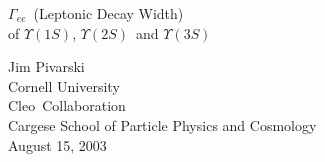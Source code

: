 

\def\ys{$\Upsilon(1S)$}
\def\yss{$\Upsilon(2S)$}
\def\ysss{$\Upsilon(3S)$}
\def\gamee{$\Gamma_{ee}$}
\def\hpqcd{{\sc Hpqcd}}
\def\argus{{\sc Argus}}
\def\cesr{{\sc Cesr}}
\def\cleo{{\sc Cleo}}
\def\cleoi{{\sc Cleo I}}
\def\cleoii{{\sc Cleo II}}
\def\cleoiii{{\sc Cleo III}}

\newcommand{\talktitle}[0]{\gamee\ of \ys, \yss\ and \ysss}
\newcommand{\fmttitle}[0]{}
\newcommand{\conftitle}[0]{Cargese School of Particle Physics and Cosmology}
\newcommand{\myname}[0]{Jim Pivarski}
\newcommand{\affila}[0]{Cornell University, \cleo\ Collaboration}
\newcommand{\talkdate}[0]{August 15, 2003}

\pagestyle{conference}   %




\slideheight 7.0in
\slidewidth 8.8in 

\renewcommand{\arraystretch}{0.3}
\renewcommand{\slidetopmargin}{0.4in}
\renewcommand{\slidebottommargin}{0.9in}



\begin{slide*}

\slideframe{}

\begin{center}
\vspace{4 cm}
{\Huge \gamee\ (Leptonic Decay Width) \\
\vspace{0.5 cm} of \ys, \yss\  and \ysss}  \\
\vspace{1 cm}
\begin{center}
\end{center}
\vspace{1 cm}
{\LARGE	Jim Pivarski } \\
\vspace{0.25 cm}
{\LARGE	Cornell University } \\
\vspace{1 cm}
{\LARGE	\cleo\  Collaboration } \\
\vspace{2 cm}
\LARGE Cargese School of Particle Physics and Cosmology \\
{\LARGE \talkdate}

\end{center}

\end{slide*}

